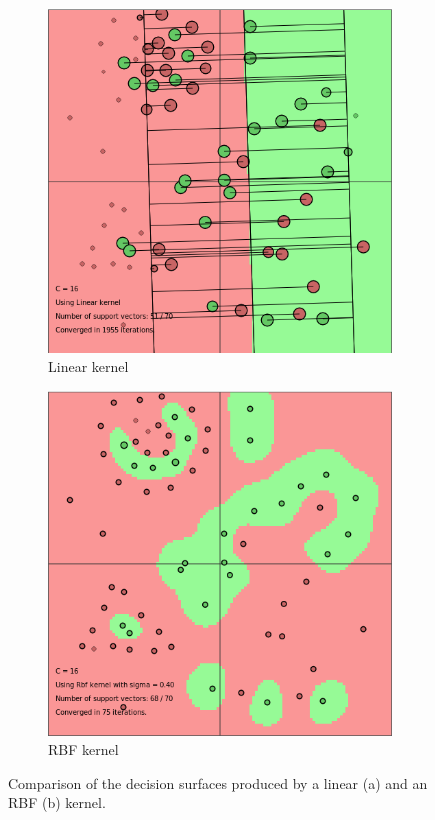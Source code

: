 \documentclass{article}
\begin{document}
    \label{fig:rbf}

\begin{figure}[]
        \begin{subfigure}{0.450\linewidth}
            \includegraphics[width=\linewidth]{linear}
            \caption{Linear kernel}
        \end{subfigure}
        \begin{subfigure}{0.45\linewidth}
            \includegraphics[width=\linewidth]{rbf}
            \caption{RBF kernel}
        \end{subfigure}
       

        \caption{Comparison of the decision surfaces produced by a linear (a) and an RBF (b) kernel. }        
        
              
        \label{fig:compare}
    \end{figure}
\end{document}
